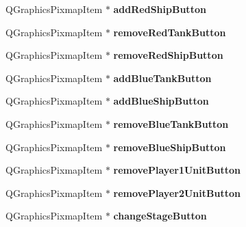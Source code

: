 \begin{DoxyCompactItemize}
\item 
Q\+Graphics\+Pixmap\+Item $\ast$ {\bfseries add\+Red\+Ship\+Button}\hypertarget{class_game_menu_a37bec2390eed30904e9c3a8ba96cc300}{}\label{class_game_menu_a37bec2390eed30904e9c3a8ba96cc300}

\item 
Q\+Graphics\+Pixmap\+Item $\ast$ {\bfseries remove\+Red\+Tank\+Button}\hypertarget{class_game_menu_a27d6aaab28d7b33fe1838a3bfd99d6b4}{}\label{class_game_menu_a27d6aaab28d7b33fe1838a3bfd99d6b4}

\item 
Q\+Graphics\+Pixmap\+Item $\ast$ {\bfseries remove\+Red\+Ship\+Button}\hypertarget{class_game_menu_aa3d84cd45a3fcb796c3f7e558dffdfc7}{}\label{class_game_menu_aa3d84cd45a3fcb796c3f7e558dffdfc7}

\item 
Q\+Graphics\+Pixmap\+Item $\ast$ {\bfseries add\+Blue\+Tank\+Button}\hypertarget{class_game_menu_a3bad751deea1957b875bdbda8543429b}{}\label{class_game_menu_a3bad751deea1957b875bdbda8543429b}

\item 
Q\+Graphics\+Pixmap\+Item $\ast$ {\bfseries add\+Blue\+Ship\+Button}\hypertarget{class_game_menu_a96db625de02a04609bef8a13a663110d}{}\label{class_game_menu_a96db625de02a04609bef8a13a663110d}

\item 
Q\+Graphics\+Pixmap\+Item $\ast$ {\bfseries remove\+Blue\+Tank\+Button}\hypertarget{class_game_menu_ac2e4f8f3a0a760347ce8aae8a3471c48}{}\label{class_game_menu_ac2e4f8f3a0a760347ce8aae8a3471c48}

\item 
Q\+Graphics\+Pixmap\+Item $\ast$ {\bfseries remove\+Blue\+Ship\+Button}\hypertarget{class_game_menu_a5291121c9137f0f5395dc907e0fab7d0}{}\label{class_game_menu_a5291121c9137f0f5395dc907e0fab7d0}

\item 
Q\+Graphics\+Pixmap\+Item $\ast$ {\bfseries remove\+Player1\+Unit\+Button}\hypertarget{class_game_menu_addbd2f8181f964d60fda59124bab548d}{}\label{class_game_menu_addbd2f8181f964d60fda59124bab548d}

\item 
Q\+Graphics\+Pixmap\+Item $\ast$ {\bfseries remove\+Player2\+Unit\+Button}\hypertarget{class_game_menu_ae4e2074109a89d582cb9e88e83f37a36}{}\label{class_game_menu_ae4e2074109a89d582cb9e88e83f37a36}

\item 
Q\+Graphics\+Pixmap\+Item $\ast$ {\bfseries change\+Stage\+Button}\hypertarget{class_game_menu_a7305ba1cbd36a0c0383968581977b66e}{}\label{class_game_menu_a7305ba1cbd36a0c0383968581977b66e}


\end{DoxyCompactItemize}
